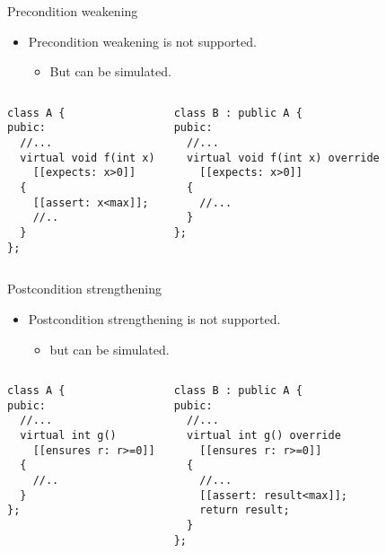 \begin{frame}[t,fragile]{Precondition weakening}
\begin{itemize}
  \item Precondition weakening is not supported.
    \begin{itemize}
      \item But can be simulated.
    \end{itemize}
\end{itemize}

\vfill\pause
\begin{columns}[T]

\begin{lstlisting}
class A {
pubic:
  //...
  virtual void f(int x)
    [[expects: x>0]]
  {
    [[assert: x<max]];
    //..
  }
};
\end{lstlisting}

\begin{lstlisting}
class B : public A {
pubic:
  //...
  virtual void f(int x) override
    [[expects: x>0]]
  {
    //...
  }
};
\end{lstlisting}

\end{columns}
\end{frame}

\begin{frame}[t,fragile]{Postcondition strengthening}
\begin{itemize}
  \item Postcondition strengthening is not supported.
    \begin{itemize}
      \item but can be simulated.
    \end{itemize}
\end{itemize}

\vfill\pause
\begin{columns}[T]

\begin{lstlisting}
class A {
pubic:
  //...
  virtual int g()
    [[ensures r: r>=0]]
  {
    //..
  }
};
\end{lstlisting}

\begin{lstlisting}
class B : public A {
pubic:
  //...
  virtual int g() override
    [[ensures r: r>=0]]
  {
    //...
    [[assert: result<max]];
    return result;
  }
};
\end{lstlisting}

\end{columns}

\end{frame}
